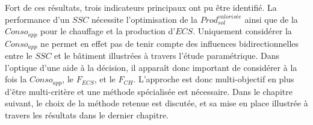 Fort de ces résultats, trois indicateurs principaux ont pu être identifié. La performance
d’un $SSC$ nécessite l’optimisation de la $Prod_{sol}^{valorisée}$ ainsi que de la
$Conso_{app}$ pour le chauffage et la production d’$ECS$. Uniquement considérer la
$Conso_{app}$ ne permet en effet pas de tenir compte des influences bidirectionnelles
entre le $SSC$ et le bâtiment illustrées à travers l’étude paramétrique. Dans l’optique
d’une aide à la décision, il apparaît donc important de considérer à la fois la
$Conso_{app}$, le $F_{ECS}$, et le $F_{CH}$. L’approche est donc multi-objectif en plus
d’être multi-critère et une méthode spécialisée est nécessaire. Dans le chapitre suivant,
le choix de la méthode retenue est discutée, et sa mise en place illustrée à travers les
résultats dans le dernier chapitre.
